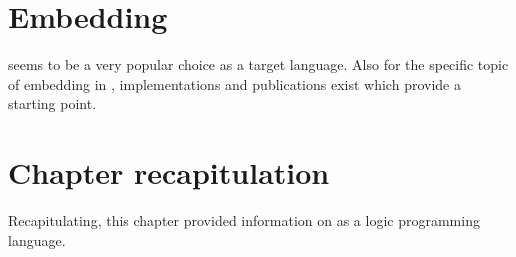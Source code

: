 \documentclass[thesis-solanki.tex]{subfiles}
\begin{document}
\section{Embedding }

 seems to be a very popular choice as a target language. Also for the specific topic of embedding  in 
, implementations and publications exist which provide a starting point.


\section{Chapter recapitulation}
Recapitulating, this chapter provided information on  as a logic programming language.

\ifMain
\begin{scope}
  \nolinenumbers
  \enotesize
  \par
  \begin{singlespace}
  \setlength{\parskip}{12pt plus 2pt minus 1pt}
  \theendnotes
  \par
  \end{singlespace}
\end{scope}
\fi
\end{document}
